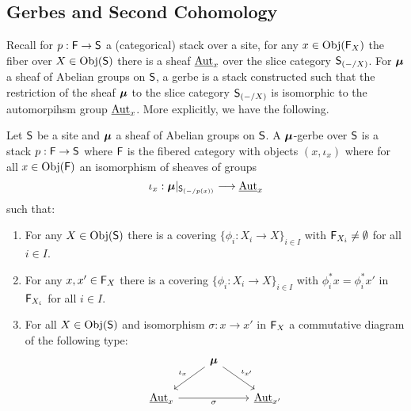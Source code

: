 \subsection{Gerbes and Second Cohomology}\label{subsec: gerbes and second cohomology}
Recall for $p:\mathsf{F}\to\mathsf{S}$ a (categorical) stack over a site, for any $x\in\mathrm{Obj}(\mathsf{F}_{X})$ the fiber over $X\in\mathrm{Obj}(\mathsf{S})$ there is a sheaf $\operatorname{\underline{\mathrm{Aut}}}_{x}$ over the slice category $\mathsf{S}_{(-/X)}$. For $\bm{\mu}$ a sheaf of Abelian groups on $\mathsf{S}$, a gerbe is a stack constructed such that the restriction of the sheaf $\bm{\mu}$ to the slice category $\mathsf{S}_{(-/X)}$ is isomorphic to the automorpihsm group $\operatorname{\underline{\mathrm{Aut}}}_{x}$. More explicitly, we have the following. 
\begin{definition}[Gerbe]\label{def: gerbe}
    Let $\mathsf{S}$ be a site and $\bm{\mu}$ a sheaf of Abelian groups on $\mathsf{S}$. A $\bm{\mu}$-gerbe over $\mathsf{S}$ is a stack $p:\mathsf{F}\to\mathsf{S}$ where $\mathsf{F}$ is the fibered category with objects $(x,\iota_{x})$ where for all $x\in\mathrm{Obj}(\mathsf{F})$ an isomorphism of sheaves of groups 
    $$\iota_{x}:\bm{\mu}|_{\mathsf{S}_{(-/p(x))}}\longrightarrow\operatorname{\underline{\mathrm{Aut}}}_{x}$$
    such that:
    \begin{enumerate}[label=(\alph*)]
        \item For any $X\in\mathrm{Obj}(\mathsf{S})$ there is a covering $\{\phi_{i}:X_{i}\to X\}_{i\in I}$ with $\mathsf{F}_{X_{i}}\neq\emptyset$ for all $i\in I$.
        \item For any $x,x'\in\mathsf{F}_{X}$ there is a covering $\{\phi_{i}:X_{i}\to X\}_{i\in I}$ with $\phi_{i}^{*}x=\phi_{i}^{*}x'$ in $\mathsf{F}_{X_{i}}$ for all $i\in I$. 
        \item For all $X\in\mathrm{Obj}(\mathsf{S})$ and isomorphism $\sigma:x\to x'$ in $\mathsf{F}_{X}$ a commutative diagram of the following type:
        $$%
        \begin{tikzcd}
            & \Bmu \\
            {\ulAut_{x}} && {\ulAut_{x'}}
            \arrow["{\iota_{x}}"', from=1-2, to=2-1]
            \arrow["{\iota_{x'}}", from=1-2, to=2-3]
            \arrow["\sigma"', from=2-1, to=2-3]
        \end{tikzcd}$$
    \end{enumerate}
\end{definition}
